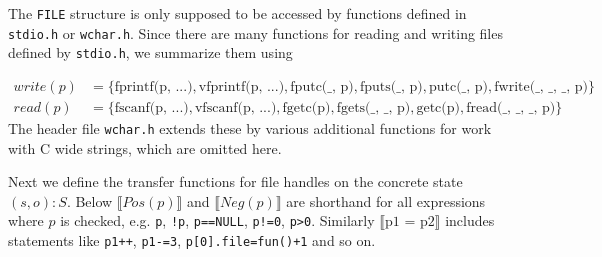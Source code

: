 The \verb|FILE| structure is only supposed to be accessed by functions defined in \verb|stdio.h| or \verb|wchar.h|.
Since there are many functions for reading and writing files defined by \verb|stdio.h|, we summarize them using

%

\begin{align}
write(p) &= \{
\text{fprintf(p, ...)}, \text{vfprintf(p, ...)},
\text{fputc(\_, p)}, \text{fputs(\_, p)},    \text{putc(\_, p)},
\text{fwrite(\_, \_, \_, p)} \}\\
read(p)  &= \{ \text{fscanf(p, ...)},  \text{vfscanf(p, ...)},
\text{fgetc(p)},    \text{fgets(\_, \_, p)}, \text{getc(p)},
\text{fread(\_, \_, \_, p)} \}
\end{align}
The header file \verb|wchar.h| extends these by various additional functions for work with C wide strings, which are omitted here. 

Next we define the transfer functions for file handles on the concrete state $(s,o) : S$.
Below $\llbracket Pos(p) \rrbracket$ and $\llbracket Neg(p) \rrbracket$ are shorthand for all expressions where $p$ is checked, e.g. \verb|p|, \verb|!p|, \verb|p==NULL|, \verb|p!=0|, \verb|p>0|.
Similarly $\llbracket \text{p1 = p2} \rrbracket$ includes statements like \verb|p1++|, \verb|p1-=3|, \verb|p[0].file=fun()+1| and so on.

